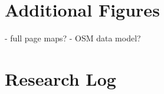 \appendix

\chapter{Additional Figures}
\label{appendixlabel2}

- full page maps?
- OSM data model? 

\chapter{Research Log}
\label{appendixlabel3}




